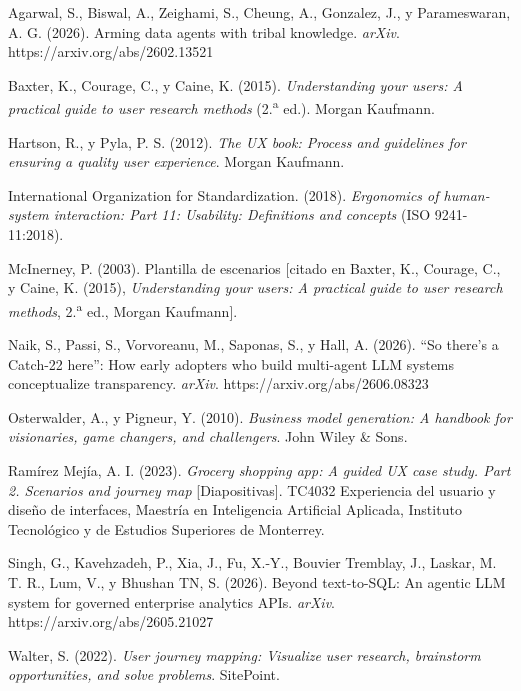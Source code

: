 \begin{uxreferencias}
Agarwal, S., Biswal, A., Zeighami, S., Cheung, A., Gonzalez, J., y Parameswaran, A. G. (2026).
Arming data agents with tribal knowledge. \textit{arXiv}. https://arxiv.org/abs/2602.13521

Baxter, K., Courage, C., y Caine, K. (2015). \textit{Understanding your users: A practical
guide to user research methods} (2.\textsuperscript{a} ed.). Morgan Kaufmann.

Hartson, R., y Pyla, P. S. (2012). \textit{The UX book: Process and guidelines for ensuring a
quality user experience}. Morgan Kaufmann.

International Organization for Standardization. (2018). \textit{Ergonomics of human-system
interaction: Part 11: Usability: Definitions and concepts} (ISO 9241-11:2018).

McInerney, P. (2003). Plantilla de escenarios [citado en Baxter, K., Courage, C., y Caine, K.
(2015), \textit{Understanding your users: A practical guide to user research methods},
2.\textsuperscript{a} ed., Morgan Kaufmann].

Naik, S., Passi, S., Vorvoreanu, M., Saponas, S., y Hall, A. (2026). ``So there's a Catch-22
here'': How early adopters who build multi-agent LLM systems conceptualize transparency.
\textit{arXiv}. https://arxiv.org/abs/2606.08323

Osterwalder, A., y Pigneur, Y. (2010). \textit{Business model generation: A handbook for
visionaries, game changers, and challengers}. John Wiley \& Sons.

Ramírez Mejía, A. I. (2023). \textit{Grocery shopping app: A guided UX case study. Part 2.
Scenarios and journey map} [Diapositivas]. TC4032 Experiencia del usuario y diseño de
interfaces, Maestría en Inteligencia Artificial Aplicada, Instituto Tecnológico y de Estudios
Superiores de Monterrey.

Singh, G., Kavehzadeh, P., Xia, J., Fu, X.-Y., Bouvier Tremblay, J., Laskar, M. T. R., Lum, V.,
y Bhushan TN, S. (2026). Beyond text-to-SQL: An agentic LLM system for governed enterprise
analytics APIs. \textit{arXiv}. https://arxiv.org/abs/2605.21027

Walter, S. (2022). \textit{User journey mapping: Visualize user research, brainstorm
opportunities, and solve problems}. SitePoint.
\end{uxreferencias}

